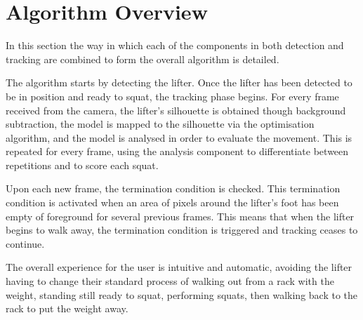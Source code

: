 \section{Algorithm Overview}
\label{sec:algorithm_overview}

In this section the way in which each of the components in both detection and tracking are combined to form the overall algorithm is detailed.

The algorithm starts by detecting the lifter. Once the lifter has been detected to be in position and ready to squat, the tracking phase begins. For every frame received from the camera, the lifter's silhouette is obtained though background subtraction, the model is mapped to the silhouette via the optimisation algorithm, and the model is analysed in order to evaluate the movement. This is repeated for every frame, using the analysis component to differentiate between repetitions and to score each squat.

Upon each new frame, the termination condition is checked. This termination condition is activated when an area of pixels around the lifter's foot has been empty of foreground for several previous frames. This means that when the lifter begins to walk away, the termination condition is triggered and tracking ceases to continue.

The overall experience for the user is intuitive and automatic, avoiding the lifter having to change their standard process of walking out from a rack with the weight, standing still ready to squat, performing squats, then walking back to the rack to put the weight away.